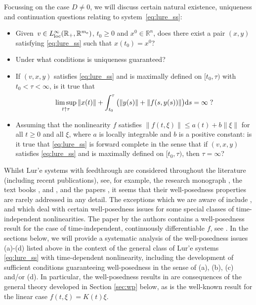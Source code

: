 \documentclass[a4paper,11pt]{article}
\newcommand{\R}{\mathbb R}
\numberwithin{equation}{section}
\numberwithin{figure}{section}
\numberwithin{table}{section}
\begin{document}
Focussing on the case $D \neq 0$, we will discuss certain natural existence, uniqueness and continuation questions relating to system~\eqref{eq:lure_ss}:
\begin{itemize}
\item[(a)] Given~$v\in L^\infty_{\rm loc}(\R_+,\R^{m_{\rm e}})$, $t_0\geq 0$ and $x^0\in\R^n$, does there exist a pair $(x,y)$ satisfying \eqref{eq:lure_ss} such that
    $x(t_0)=x^0$?
\item[(b)] Under what conditions is uniqueness guaranteed?
\item[(c)] If $(v,x,y)$ satisfies \eqref{eq:lure_ss} and is maximally defined on $[t_0,\tau)$
with $t_0<\tau<\infty$, is it true that
\[ \limsup_{t\uparrow \tau}\|x(t)\|+\int_{t_0}^\tau\big(\|y(s)\|+\|f(s,y(s))\|\big){\rm d}s=\infty\;?\]
\item[(d)] Assuming that the nonlinearity $f$ satisfies $\|f(t,\xi)\|\leq a(t)+b\|\xi\|$ for all $t\geq 0$ and all $\xi$, where $a$ is locally integrable and
    $b$ is a positive constant: is it true that \eqref{eq:lure_ss} is forward complete in the sense that if $(v,x,y)$ satisfies \eqref{eq:lure_ss} and is maximally defined on $[t_0,\tau)$, then $\tau=\infty$?
\end{itemize}
%
Whilst Lur'e systems with feedthrough are considered throughout the literature (including
recent publications), see, for example, the research monograph \cite[Sections 3.13 and 3.14]{blme20}, the text books
\cite[Sections 5.7 and 5.8]{hc08}, \cite[Section 7.1]{k02} and \cite[Section 5.6]{v93}, and the papers \cite{bonp24,bovp22,gl24,hb93,tkp09,vdd19,zt02}, it seems that their well-posedness properties are rarely addressed in any detail. The exceptions which we are aware of include
\cite[Lemma 3.94]{blme20}, \cite[Assumption 1 and Appendix B]{vdd19} and \cite[Claim 1 and Appendix B]{zt02} which deal with certain well-posedness issues for some special classes of time-independent nonlinearities. The paper \cite{gl24} by
the authors contains a well-posedness result for the case of time-independent, continuously differentiable $f$, see \cite[Proposition 3.2]{gl24}. In the sections below, we will provide
a systematic analysis of the well-posedness issues (a)-(d) listed above in the context
of the general class of Lur'e systems \eqref{eq:lure_ss} with time-dependent nonlinearity,
including the
development of sufficient conditions guaranteeing well-posedness in the sense of (a), (b), (c)
and/or (d). In particular, the well-posedness results in \cite{blme20,gl24,vdd19,zt02} are consequences of the general theory developed in Section \ref{sec:wp} below, as is the well-known
result for the linear case $f(t,\xi) = K(t)\xi$.
\end{document}
